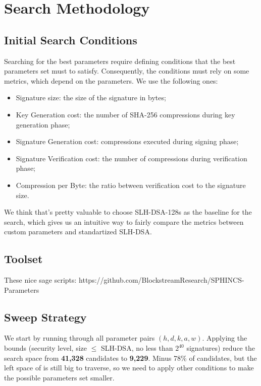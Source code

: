 \section{Search Methodology}

\subsection{Initial Search Conditions}

Searching for the best parameters require defining conditions that the best parameters set must to satisfy.  Consequently, the conditions must rely on some metrics, which depend on the parameters. We use the following ones:

\begin{itemize}
    \item Signature size: the size of the signature in bytes;
    \item Key Generation cost: the number of SHA-256 compressions during key generation phase;
    \item Signature Generation cost: compressions executed during signing phase;
    \item Signature Verification cost: the number of compressions during verification phase;
    \item Compression per Byte: the ratio between verification cost to the signature size.
\end{itemize}

We think that's pretty valuable to choose SLH-DSA-128s as the baseline for the search, which gives us an intuitive way to fairly compare the metrics between custom parameters and standartized SLH-DSA.

\subsection{Toolset}
These nice sage scripts: https://github.com/BlockstreamResearch/SPHINCS-Parameters

\subsection{Sweep Strategy}
We start by running through all parameter pairs $(h,d,k,a,w)$.  Applying the bounds (security level, size $\leq$ SLH-DSA, no less than $2^{40}$ signatures) reduce the search space from \textbf{41,328} candidates to \textbf{9,229}. Minus 78\% of candidates, but the left space of is still big to traverse, so we need to apply other conditions to make the possible parameters set smaller. 

